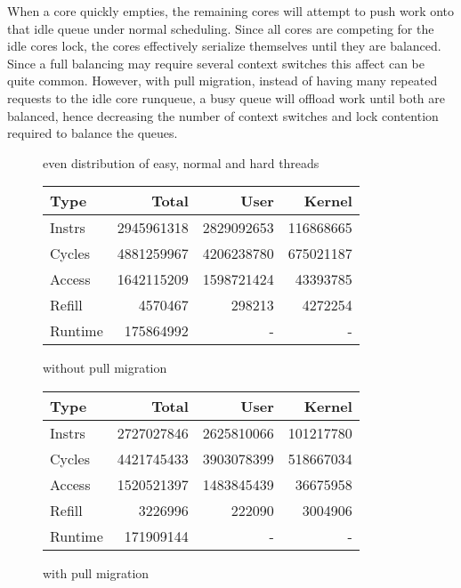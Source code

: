 \documentclass[11pt]{article}
\begin{document}
When a core quickly empties, the remaining cores will attempt to push work onto that idle queue under normal scheduling.  Since all cores are competing for the idle cores lock, the cores effectively serialize themselves until they are balanced.  Since a full balancing may require several context switches this affect can be quite common.  However, with pull migration, instead of having many repeated requests to the idle core runqueue, a busy queue will offload work until both are balanced, hence decreasing the number of context switches and lock contention required to balance the queues.

\begin{figure*}[!h]
	\caption{even distribution of easy, normal and hard threads}
	\label{fig:pull-runtime}
	\centering
	\begin{subtable}[b]{.48\linewidth}
		\centering                 
		\begin{tabular}{ l|rrr }
			Type    & Total      & User       & Kernel    \\
			\hline
			Instrs  & 2945961318 & 2829092653 & 116868665 \\ 
			Cycles  & 4881259967 & 4206238780 & 675021187 \\ 
			Access  & 1642115209 & 1598721424 & 43393785  \\ 
			Refill  & 4570467    & 298213     & 4272254   \\ 
			Runtime & 175864992  & -          & -         \\
			\hline
		\end{tabular}
		\caption{without pull migration}    
	\end{subtable}
	\hfill
	\begin{subtable}[b]{.48\linewidth}
		\centering
		\begin{tabular}{ l|rrr }
			Type    & Total      & User       & Kernel    \\
			\hline
			Instrs  & 2727027846 & 2625810066 & 101217780 \\ 
			Cycles  & 4421745433 & 3903078399 & 518667034 \\ 
			Access  & 1520521397 & 1483845439 & 36675958  \\ 
			Refill  & 3226996    & 222090     & 3004906   \\ 
			Runtime & 171909144  & -          & -         \\
			\hline
		\end{tabular}
		\caption{with pull migration}
	\end{subtable}
\end{figure*}
\end{document}

